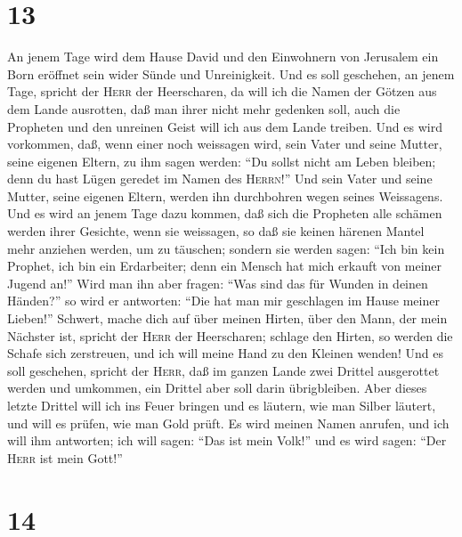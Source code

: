 \hypertarget{section-12}{%
\section{13}\label{section-12}}

 An jenem Tage wird dem Hause David und den Einwohnern von
Jerusalem ein Born eröffnet sein wider Sünde und Unreinigkeit.
 Und es soll geschehen, an jenem Tage, spricht der
\textsc{Herr} der Heerscharen, da will ich die Namen der Götzen aus dem
Lande ausrotten, daß man ihrer nicht mehr gedenken soll, auch die
Propheten und den unreinen Geist will ich aus dem Lande treiben.
 Und es wird vorkommen, daß, wenn einer noch weissagen
wird, sein Vater und seine Mutter, seine eigenen Eltern, zu ihm sagen
werden: ``Du sollst nicht am Leben bleiben; denn du hast Lügen geredet
im Namen des \textsc{Herrn}!'' Und sein Vater und seine Mutter, seine
eigenen Eltern, werden ihn durchbohren wegen seines Weissagens.
 Und es wird an jenem Tage dazu kommen, daß sich die
Propheten alle schämen werden ihrer Gesichte, wenn sie weissagen, so daß
sie keinen härenen Mantel mehr anziehen werden, um zu täuschen;
 sondern sie werden sagen: ``Ich bin kein Prophet, ich bin
ein Erdarbeiter; denn ein Mensch hat mich erkauft von meiner Jugend
an!''  Wird man ihn aber fragen: ``Was sind das für Wunden
in deinen Händen?'' so wird er antworten: ``Die hat man mir geschlagen
im Hause meiner Lieben!''  Schwert, mache dich auf über
meinen Hirten, über den Mann, der mein Nächster ist, spricht der
\textsc{Herr} der Heerscharen; schlage den Hirten, so werden die Schafe
sich zerstreuen, und ich will meine Hand zu den Kleinen wenden!
 Und es soll geschehen, spricht der \textsc{Herr}, daß im
ganzen Lande zwei Drittel ausgerottet werden und umkommen, ein Drittel
aber soll darin übrigbleiben.  Aber dieses letzte Drittel
will ich ins Feuer bringen und es läutern, wie man Silber läutert, und
will es prüfen, wie man Gold prüft. Es wird meinen Namen anrufen, und
ich will ihm antworten; ich will sagen: ``Das ist mein Volk!'' und es
wird sagen: ``Der \textsc{Herr} ist mein Gott!''

\hypertarget{section-13}{%
\section{14}\label{section-13}}


